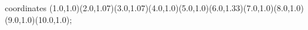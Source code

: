 					coordinates { (1.0,1.0)(2.0,1.07)(3.0,1.07)(4.0,1.0)(5.0,1.0)(6.0,1.33)(7.0,1.0)(8.0,1.0)(9.0,1.0)(10.0,1.0)};